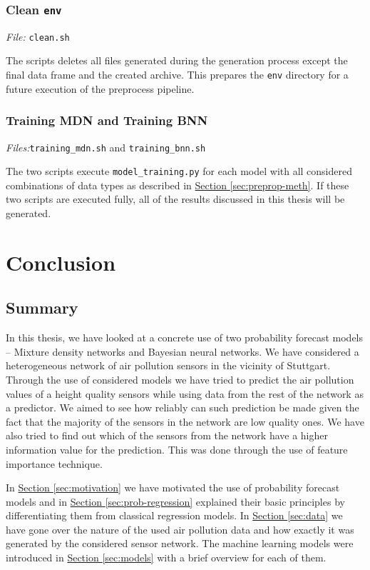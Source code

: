 \documentclass[12pt,a4paper,twoside]{scrartcl}
\numberwithin{equation}{section}
\newcommand{\refsec}[1]{\hyperref[#1]{Section \ref*{#1}}}
\begin{document}
\subsubsection{Clean \texttt{env}}\label{sec:script-clean}
\noindent\emph{File: }\texttt{clean.sh}

The scripts deletes all files generated during the generation process except the final data frame and the created archive. This prepares the \texttt{env} directory for a future execution of the preprocess pipeline.
\subsubsection{Training MDN and Training BNN}\label{sec:script-train}
\noindent\emph{Files:}\texttt{training\_mdn.sh} and \texttt{training\_bnn.sh}

The two scripts execute \texttt{model\_training.py} for each model with all considered combinations of data types as described in \refsec{sec:preprop-meth}. If these two scripts are executed fully, all of the results discussed in this thesis will be generated.
\section{Conclusion}\label{sec:conclusion}
\subsection{Summary}
In this thesis, we have looked at a concrete use of two probability forecast models -- Mixture density networks and Bayesian neural networks. We have considered a heterogeneous network of air pollution sensors in the vicinity of Stuttgart. Through the use of considered models we have tried to predict the air pollution values of a height quality sensors while using data from the rest of the network as a predictor. We aimed to see how reliably can such prediction be made given the fact that the majority of the sensors in the network are low quality ones. We have also tried to find out which of the sensors from the network have a higher information value for the prediction. This was done through the use of feature importance technique.

In \refsec{sec:motivation} we have motivated the use of probability forecast models and in \refsec{sec:prob-regression} explained their basic principles by differentiating them from classical regression models. In \refsec{sec:data} we have gone over the nature of the used air pollution data and how exactly it was generated by the considered sensor network. The machine learning models were introduced in \refsec{sec:models} with a brief overview for each of them.
\end{document}
